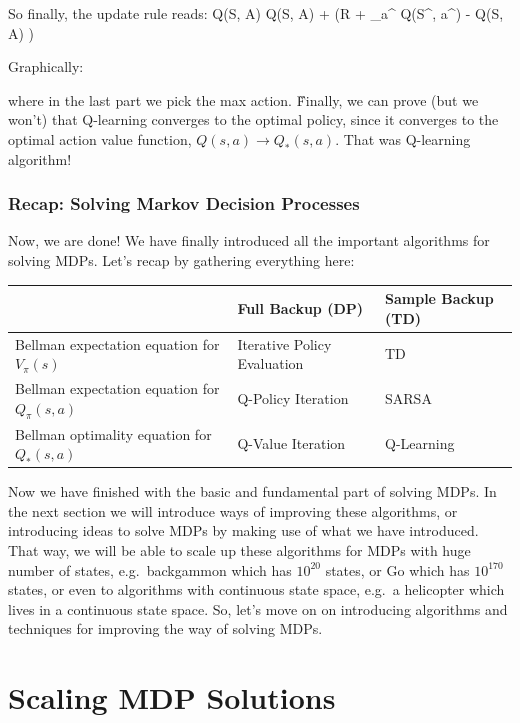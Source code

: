 \vspace{-10pt}

So finally, the update rule reads:
\bse
Q(S, A) \gets Q(S, A) + \alpha \left(R + \gamma \max_{a^\prime} Q(S^\prime, a^\prime) - Q(S, A) \right)
\ese

Graphically:


where in the last part we pick the max action. \v

Finally, we can prove (but we won't) that Q-learning converges to the optimal policy, since it converges to the
optimal action value function, $Q(s,a) \to Q_{*}(s,a)$. That was Q-learning algorithm!

\subsubsection*{Recap: Solving Markov Decision Processes}

Now, we are done! We have finally introduced all the important algorithms for solving MDPs. Let's recap by gathering
everything here:

\btab[H]
\centering
\begin{tabular}{lll}
\toprule
& \textbf{Full Backup (DP)} & \textbf{Sample Backup (TD)} \\
\midrule
Bellman expectation equation for $V_{\pi}(s)$ & Iterative Policy Evaluation & TD \\
Bellman expectation equation for $Q_{\pi}(s,a)$ & Q-Policy Iteration & SARSA \\
Bellman optimality equation for $Q_{*}(s,a)$ & Q-Value Iteration & Q-Learning \\
\bottomrule
\end{tabular}
\etab

Now we have finished with the basic and fundamental part of solving MDPs. In the next section we will introduce ways
of improving these algorithms, or introducing ideas to solve MDPs by making use of what we have introduced. That
way, we will be able to scale up these algorithms for MDPs with huge number of states, e.g.\ backgammon which has
$10^{20}$ states, or Go which has $10^{170}$ states, or even to algorithms with continuous state space, e.g.\ a
helicopter which lives in a continuous state space. So, let's move on on introducing algorithms and techniques for
improving the way of solving MDPs.

\section{Scaling MDP Solutions}

